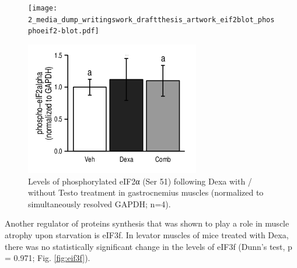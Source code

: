 \documentclass[12pt,english]{report}\usepackage[]{graphicx}\usepackage[]{color}
\newenvironment{knitrout}{}{} %
\begin{document}
\begin{figure}
\begin{minipage}[t][2in][c]{3in}%
\texttt{[image: 2\_media\_dump\_writingswork\_draftthesis\_artwork\_eif2blot\_phosphoeif2-blot.pdf]}%
\end{minipage}%
\begin{minipage}[t][2.2in][c]{3in}%
\begin{knitrout}
\color{fgcolor}
\includegraphics[width=3in,height=2.in]{figure/eiftwo-1} 

\end{knitrout}
%
\end{minipage}

\protect\caption[Levels of phosphorylated eIF2α following Dexa with / without Testo
treatments.]{Levels of phosphorylated eIF2α (Ser 51) following Dexa with / without
Testo treatment in gastrocnemius muscles (normalized to simultaneously
resolved GAPDH; n=4)\label{fig:Phosphorylated-eif2}.}
\end{figure}


Another regulator of proteins synthesis that was shown to play a role
in muscle atrophy upon starvation is eIF3f. In levator muscles of
mice treated with Dexa, there was no statistically significant change
in the levels of eIF3f (Dunn's test, p = 0.971;
Fig. \ref{fig:eif3f}).
\end{document}
